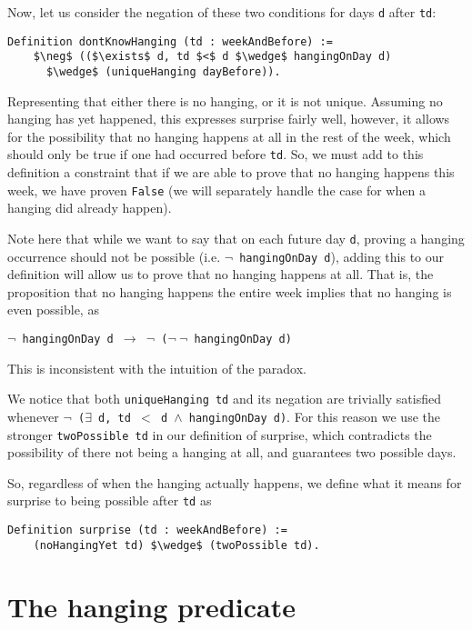 \documentclass[runningheads]{llncs}
\begin{document}
Now, let us consider the negation of these two conditions for days {\tt d} after {\tt td}:

\begin{lstlisting}[mathescape=true]
  Definition dontKnowHanging (td : weekAndBefore) :=
    $\neg$ (($\exists$ d, td $<$ d $\wedge$ hangingOnDay d)
      $\wedge$ (uniqueHanging dayBefore)).
\end{lstlisting}

Representing that either there is no hanging, or it is not unique. Assuming no
hanging has yet happened, this expresses surprise fairly
well, however, it allows for the possibility that no hanging happens at all in the
rest of the week, which should only be true if one had occurred before {\tt td}.
So, we must add to this definition a constraint that if we are able to prove that no
hanging happens this week, we have proven {\tt False} (we will separately handle the case for when
a hanging did already happen).

Note here that while we want to say that on each future day {\tt d}, proving a hanging
occurrence should not be possible (i.e. {\tt $\neg$ hangingOnDay d}), adding this to
our definition will allow us to
prove that no hanging happens at all.
That is, the proposition that no hanging happens the entire week implies that no
hanging is even possible, as \newline

{\tt $\neg$ hangingOnDay d $\to$ $\neg$ ($\neg~\neg$ hangingOnDay d)} \newline

This is inconsistent with the intuition of the paradox.

We notice that both {\tt uniqueHanging td} and its negation are trivially
satisfied whenever {\tt $\neg$ ($\exists$ d, td $<$ d $\wedge$ hangingOnDay d)}. For this
reason we use the stronger {\tt twoPossible td} in our definition of surprise,
which contradicts the possibility of there not being a hanging at all, and
guarantees two possible days.

So, regardless of when the hanging actually happens, we define what it means
for surprise to being possible after {\tt td} as

\begin{lstlisting}[mathescape=true]
  Definition surprise (td : weekAndBefore) :=
    (noHangingYet td) $\wedge$ (twoPossible td).
\end{lstlisting}

\section{The hanging predicate}
\label{sec:predicate}
\end{document}
